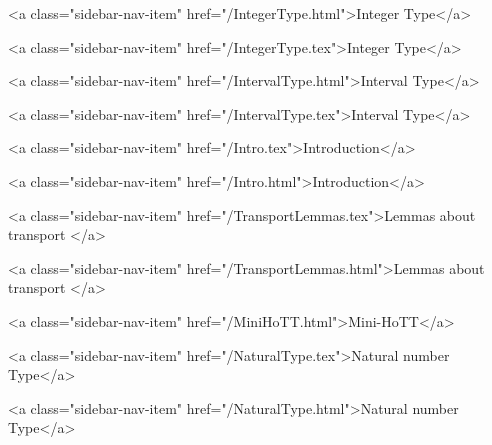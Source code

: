       
    
      
        
          <a class="sidebar-nav-item" href="/IntegerType.html">Integer Type</a>
        
      
    
      
        
          <a class="sidebar-nav-item" href="/IntegerType.tex">Integer Type</a>
        
      
    
      
        
          <a class="sidebar-nav-item" href="/IntervalType.html">Interval Type</a>
        
      
    
      
        
          <a class="sidebar-nav-item" href="/IntervalType.tex">Interval Type</a>
        
      
    
      
        
          <a class="sidebar-nav-item" href="/Intro.tex">Introduction</a>
        
      
    
      
        
          <a class="sidebar-nav-item" href="/Intro.html">Introduction</a>
        
      
    
      
        
          <a class="sidebar-nav-item" href="/TransportLemmas.tex">Lemmas about transport </a>
        
      
    
      
        
          <a class="sidebar-nav-item" href="/TransportLemmas.html">Lemmas about transport </a>
        
      
    
      
        
          <a class="sidebar-nav-item" href="/MiniHoTT.html">Mini-HoTT</a>
        
      
    
      
        
          <a class="sidebar-nav-item" href="/NaturalType.tex">Natural number Type</a>
        
      
    
      
        
          <a class="sidebar-nav-item" href="/NaturalType.html">Natural number Type</a>
        
